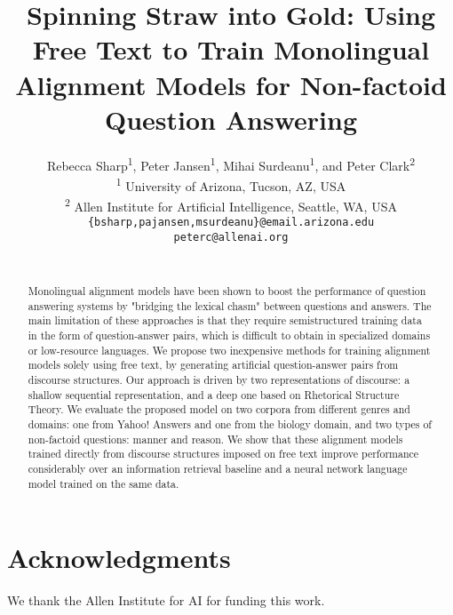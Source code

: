 \documentclass[11pt,letterpaper]{article}
\title{Spinning Straw into Gold: Using Free Text to Train Monolingual Alignment Models for Non-factoid Question Answering}
\author{Rebecca Sharp\textsuperscript{1}, Peter Jansen\textsuperscript{1}, Mihai Surdeanu\textsuperscript{1}, {\textnormal {and}} Peter Clark\textsuperscript{2}  \\
  \textsuperscript{1} University of Arizona, Tucson, AZ, USA \\
  \textsuperscript{2} Allen Institute for Artificial Intelligence, Seattle, WA, USA \\
  {\tt \{bsharp,pajansen,msurdeanu\}@email.arizona.edu} \\
  {\tt peterc@allenai.org} \\
  \\}
\begin{document}
\maketitle


\begin{abstract}
Monolingual alignment models have been shown to boost the performance of question answering systems by "bridging the lexical chasm" between questions and answers.
The main limitation of these approaches is that they require semistructured training data in the form of question-answer pairs, which is difficult to obtain in specialized domains or low-resource languages.
We propose two inexpensive methods for training alignment models solely using free text, by generating artificial question-answer pairs from discourse structures. Our approach is driven by two representations of discourse: a shallow sequential representation, and a deep one based on Rhetorical Structure Theory. 
We evaluate the proposed model on two corpora from different genres and domains: one from Yahoo! Answers and one from the biology domain, and two types of non-factoid questions: manner and reason. We show that these alignment models trained directly from discourse structures imposed on free text
improve performance considerably over an information retrieval baseline and a neural network language model trained on the same data.
%

\end{abstract}






%
%

\vspace{-2mm}
\section*{Acknowledgments}
\vspace{-2mm}
We thank the Allen Institute for AI for funding this work.

%



%
%
\end{document}
